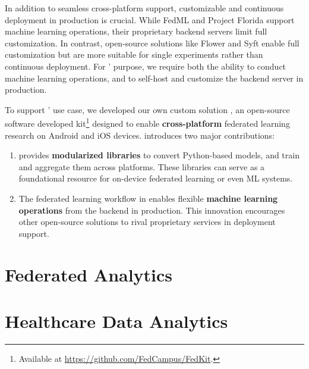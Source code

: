 In addition to seamless cross-platform support,
customizable and continuous deployment in production is crucial.
While FedML and Project Florida support machine learning operations,
their proprietary backend servers limit full customization.
In contrast, open-source solutions like Flower and Syft enable
full customization
but are more suitable for single experiments rather than continuous deployment.
For \fedcampus' purpose,
we require both the ability to conduct machine learning operations,
and to self-host and customize the backend server in production.

To support \fedcampus' use case, we developed our own custom solution \fedkit,
an open-source software developed kit\footnote{
    Available at \url{https://github.com/FedCampus/FedKit}.
} designed to enable \textbf{cross-platform}
federated learning research on Android and iOS devices.
\fedkit introduces two major contributions:

\begin{enumerate}
\item \fedkit provides \textbf{modularized libraries} to convert Python-based models,
    and train and aggregate them across platforms.
    These libraries can serve as a foundational resource for
    on-device federated learning or even ML systems.
\item The federated learning workflow in \fedkit
    enables flexible \textbf{machine learning operations} from
    the backend in production.
    This innovation encourages other open-source solutions to
    rival proprietary services in deployment support.
\end{enumerate}

\section{Federated Analytics}

\section{Healthcare Data Analytics}
